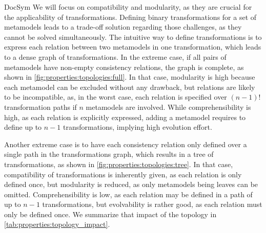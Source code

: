 \begin{copiedFrom}{DocSym}
We will focus on compatibility and modularity, as they are crucial for the applicability of transformations. %
Defining binary transformations %
for a set of metamodels leads to a trade-off solution regarding those challenges, as they cannot be solved simultaneously.
The intuitive way to define transformations %
is to express each relation between two metamodels in one transformation, which leads to a dense graph of transformations. %
In the extreme case, if all pairs of metamodels have non-empty consistency relations, the graph is complete, as shown in \autoref{fig:properties:topologies:full}.
In that case, modularity is high because each metamodel can be excluded without any drawback, %
but relations are likely to be incompatible, as, in the worst case, each relation is specified over $(n-1)!$ transformation paths if $n$ metamodels are involved.
While comprehensibility is high, as each relation is explicitly expressed, adding a metamodel requires to define up to $n-1$ transformations, implying high evolution effort.

Another extreme case is to have each consistency relation only defined over a single path in the transformations graph, which results in a tree of transformations, as shown in \autoref{fig:properties:topologies:tree}.
In that case, compatibility of transformations is inherently given, as each relation is only defined once, but modularity is reduced, as only metamodels being leaves can be omitted.
Comprehensibility is low, as each relation may be defined in a path of up to $n-1$ transformations, but evolvability is rather good, as each relation must only be defined once. %
We summarize that impact of the topology in \autoref{tab:properties:topology_impact}.


\end{copiedFrom}
